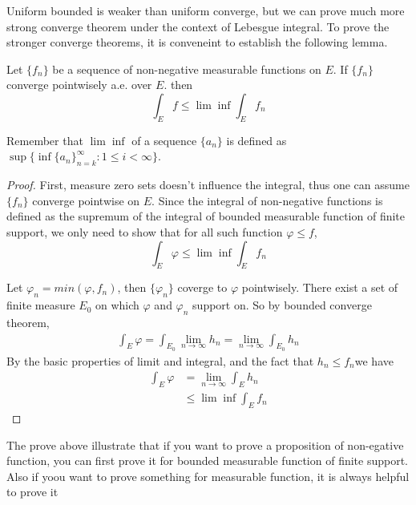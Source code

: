 \documentclass[lang=en, 12pt]{elegantbook}
\begin{document}
            Uniform bounded is weaker than uniform converge, but we can prove much more strong converge theorem under the context 
        of Lebesgue integral. To prove the stronger converge theorems, it is conveneint to establish the following lemma.
        \begin{lemma}
            Let $\{f_n\}$ be a sequence of non-negative measurable functions on $E$. If $\{f_n\}$ converge pointwisely a.e. over $E$.
        then 
        $$\int_E f \leq \lim \inf \int_E f_n$$
        \end{lemma}
        Remember that $\lim \inf $ of a sequence $\{a_n\}$ is defined as $\sup \{\inf \{a_n\}_{n=k}^{\infty} : 1\leq i < \infty \}$.
        \begin{proof}
            First, measure zero sets doesn't influence the integral, thus one can assume $\{f_n\}$ converge pointwise on $E$.
        Since the integral of non-negative functions is defined as the supremum of the integral of bounded measurable function of finite 
        support, we only need to show that for all such function $\varphi \leq f$, 
        $$\int_E \varphi \leq \lim \inf \int_E f_n$$\par
            Let $\varphi_n = min(\varphi, f_n)$, then $\{\varphi_n\}$ coverge to $\varphi$ pointwisely. There exist a set of finite measure 
        $E_0$ on which $\varphi$ and $\varphi_n$ support on. So by bounded converge theorem,
        \begin{equation*}
            \begin{aligned}
                \int_E \varphi = \int_{E_0} \lim_{n \to \infty} h_n = \lim_{n \to \infty} \int_{E_0} h_n
            \end{aligned}
        \end{equation*}
        By the basic properties of limit and integral, and the fact that $h_n \leq f_n$we have 
        \begin{equation*}
            \begin{aligned}
                \int_E \varphi &= \lim_{n \to \infty} \int_E h_n\\
                &\leq \lim \inf \int_E f_n
            \end{aligned}
        \end{equation*}
        \end{proof}
            The prove above illustrate that if you want to prove a proposition of non-egative function, you can first prove it for bounded 
        measurable function of finite support. Also if yoou want to prove something for measurable function, it is always helpful to prove it 
\end{document}

